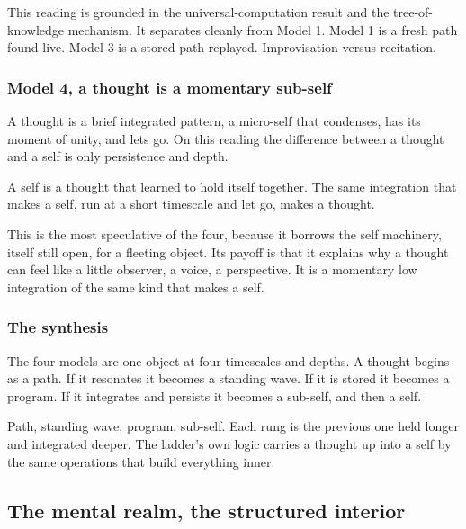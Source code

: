 This reading is grounded in the universal-computation result and the tree-of-knowledge mechanism. It separates cleanly from Model 1. Model 1 is a fresh path found live. Model 3 is a stored path replayed. Improvisation versus recitation.

\subsubsection{Model 4, a thought is a momentary sub-self}

A thought is a brief integrated pattern, a micro-self that condenses, has its moment of unity, and lets go. On this reading the difference between a thought and a self is only persistence and depth.

\begin{principle}
A self is a thought that learned to hold itself together. The same integration that makes a self, run at a short timescale and let go, makes a thought.
\end{principle}

This is the most speculative of the four, because it borrows the self machinery, itself still open, for a fleeting object. Its payoff is that it explains why a thought can feel like a little observer, a voice, a perspective. It is a momentary low integration of the same kind that makes a self.

\subsubsection{The synthesis}

The four models are one object at four timescales and depths. A thought begins as a path. If it resonates it becomes a standing wave. If it is stored it becomes a program. If it integrates and persists it becomes a sub-self, and then a self.

\begin{result}
Path, standing wave, program, sub-self. Each rung is the previous one held longer and integrated deeper. The ladder's own logic carries a thought up into a self by the same operations that build everything inner.
\end{result}

\subsection{The mental realm, the structured interior}

